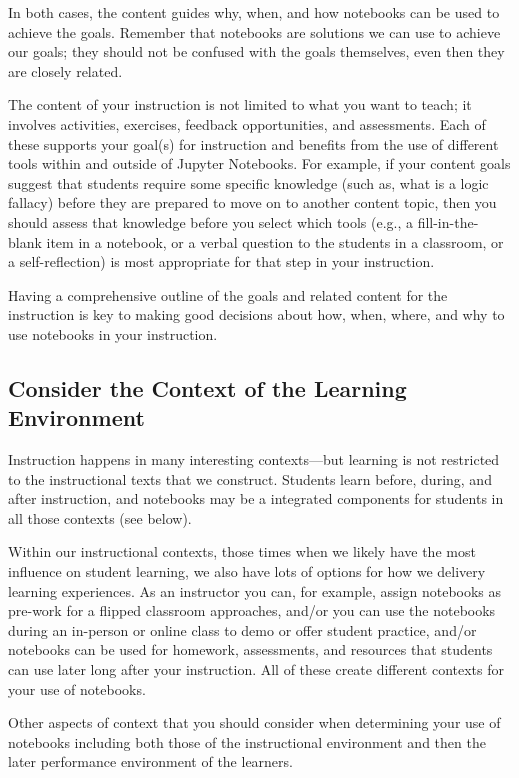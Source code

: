 \documentclass[]{book}
\begin{document}
In both cases, the content guides why, when, and how notebooks can be
used to achieve the goals. Remember that notebooks are solutions we can
use to achieve our goals; they should not be confused with the goals
themselves, even then they are closely related.

The content of your instruction is not limited to what you want to
teach; it involves activities, exercises, feedback opportunities, and
assessments. Each of these supports your goal(s) for instruction and
benefits from the use of different tools within and outside of Jupyter
Notebooks. For example, if your content goals suggest that students
require some specific knowledge (such as, what is a logic fallacy)
before they are prepared to move on to another content topic, then you
should assess that knowledge before you select which tools (e.g., a
fill-in-the-blank item in a notebook, or a verbal question to the
students in a classroom, or a self-reflection) is most appropriate for
that step in your instruction.

Having a comprehensive outline of the goals and related content for the
instruction is key to making good decisions about how, when, where, and
why to use notebooks in your instruction.

\subsection{Consider the Context of the Learning
Environment}\label{consider-the-context-of-the-learning-environment}

Instruction happens in many interesting contexts---but learning is not
restricted to the instructional texts that we construct. Students learn
before, during, and after instruction, and notebooks may be a integrated
components for students in all those contexts (see below).

Within our instructional contexts, those times when we likely have the
most influence on student learning, we also have lots of options for how
we delivery learning experiences. As an instructor you can, for example,
assign notebooks as pre-work for a flipped classroom approaches, and/or
you can use the notebooks during an in-person or online class to demo or
offer student practice, and/or notebooks can be used for homework,
assessments, and resources that students can use later long after your
instruction. All of these create different contexts for your use of
notebooks.

Other aspects of context that you should consider when determining your
use of notebooks including both those of the instructional environment
and then the later performance environment of the learners.
\end{document}

